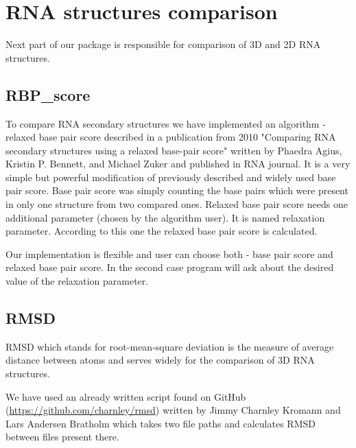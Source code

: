 \section{RNA structures comparison}

Next part of our package is responsible for comparison of 3D and 2D RNA structures.

\subsection{RBP_score}

To compare RNA secondary structures we have implemented an algorithm - 
relaxed base pair score described in a publication from 2010
"Comparing RNA secondary structures using a relaxed base-pair score" written by
Phaedra Agius, Kristin P. Bennett, and Michael Zuker and published in RNA journal.
It is a very simple but powerful modification of previously described and widely used
base pair score. Base pair score was simply counting the base pairs which
were present in only one structure from two compared ones. Relaxed base pair score
needs one additional parameter (chosen by the algorithm user). It is named
relaxation parameter. According to this one the relaxed base pair score is calculated.

Our implementation is flexible and user can choose both - base pair score and
relaxed base pair score. In the second case program will ask about the desired
value of the relaxation parameter.

\subsection{RMSD}

RMSD which stands for root-mean-square deviation is the measure of average distance
between atoms and serves widely for the comparison of 3D RNA structures.

We have used an already written script found on GitHub (\url{https://github.com/charnley/rmsd})
written by Jimmy Charnley Kromann and Lars Andersen Bratholm
which takes two file paths and calculates RMSD between files present there.